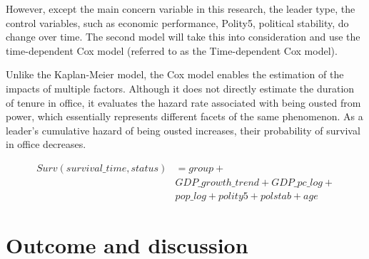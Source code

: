 \documentclass[
  12pt,
  a4paper,
  12pt]{article}
\begin{document}
However, except the main concern variable in this research, the leader
type, the control variables, such as economic performance, Polity5,
political stability, do change over time. The second model will take
this into consideration and use the time-dependent Cox model (referred
to as the Time-dependent Cox model).

Unlike the Kaplan-Meier model, the Cox model enables the estimation of
the impacts of multiple factors. Although it does not directly estimate
the duration of tenure in office, it evaluates the hazard rate
associated with being ousted from power, which essentially represents
different facets of the same phenomenon. As a leader's cumulative hazard
of being ousted increases, their probability of survival in office
decreases.

\begin{equation}
\begin{aligned}
Surv(survival\_time, status) &= group + \\
&GDP\_growth\_trend + GDP\_pc\_log + \\
&pop\_log + polity5 + polstab + age
\end{aligned}
\end{equation}

\newpage

\section{Outcome and discussion}\label{outcome-and-discussion}
\end{document}
